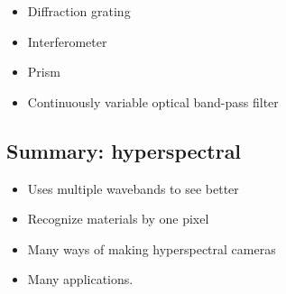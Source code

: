 	\begin{itemize}
		\item Diffraction grating
		\item Interferometer
		\item Prism
		\item Continuously variable optical band-pass filter
	\end{itemize}

	\subsection{Summary: hyperspectral}
	\begin{itemize}
		\item Uses multiple wavebands to see better
		\item Recognize materials by one pixel
		\item Many ways of making hyperspectral cameras
		\item Many applications. 
	\end{itemize}
	
	
	